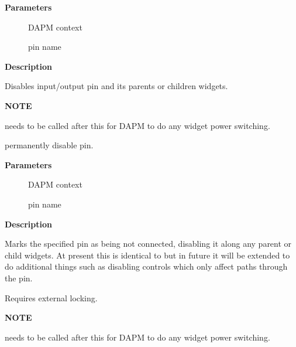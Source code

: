 \documentclass[a4paper,8pt,english]{sphinxmanual}
\begin{document}
\textbf{Parameters}
\begin{description}
\item[{}] \leavevmode
DAPM context

\item[{}] \leavevmode
pin name

\end{description}

\textbf{Description}

Disables input/output pin and its parents or children widgets.

\textbf{NOTE}

{\hyperref[sound/kernel\string-api/alsa\string-driver\string-api:c.snd_soc_dapm_sync]{\emph{}}} needs to be called after this for DAPM to
do any widget power switching.

\begin{fulllineitems}
\label{sound/kernel-api/alsa-driver-api:c.snd_soc_dapm_nc_pin_unlocked}
permanently disable pin.

\end{fulllineitems}


\textbf{Parameters}
\begin{description}
\item[{}] \leavevmode
DAPM context

\item[{}] \leavevmode
pin name

\end{description}

\textbf{Description}

Marks the specified pin as being not connected, disabling it along
any parent or child widgets.  At present this is identical to
{\hyperref[sound/kernel\string-api/alsa\string-driver\string-api:c.snd_soc_dapm_disable_pin]{\emph{}}} but in future it will be extended to do
additional things such as disabling controls which only affect
paths through the pin.

Requires external locking.

\textbf{NOTE}

{\hyperref[sound/kernel\string-api/alsa\string-driver\string-api:c.snd_soc_dapm_sync]{\emph{}}} needs to be called after this for DAPM to
do any widget power switching.
\end{document}
